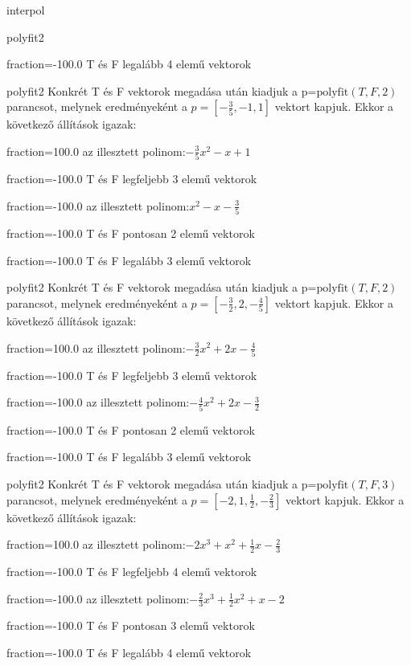 \documentclass[12pt]{article}
\begin{document}
\begin{quiz}{interpol}
\begin{multi}[multiple]{polyfit2}
\item[fraction=-100.0] T és F legalább 4 elemű vektorok
\end{multi}
\begin{multi}[multiple]{polyfit2}
Konkrét T és F vektorok megadása után kiadjuk a p=$\mathrm{polyfit}(T,F,2)$
parancsot, melynek eredményeként a $p=\left[-\frac{3}{5},-1,1\right]$ vektort kapjuk.
Ekkor a következő állítások igazak:
\item[fraction=100.0] az illesztett polinom:$-\frac{3}{5}x^2-x+1$
\item[fraction=-100.0]  T és F legfeljebb 3 elemű vektorok
\item[fraction=-100.0]  az illesztett polinom:$x^2-x-\frac{3}{5}$
\item[fraction=-100.0]  T és F pontosan 2 elemű vektorok
\item[fraction=-100.0] T és F legalább 3 elemű vektorok
\end{multi}
\begin{multi}[multiple]{polyfit2}
Konkrét T és F vektorok megadása után kiadjuk a p=$\mathrm{polyfit}(T,F,2)$
parancsot, melynek eredményeként a $p=\left[-\frac{3}{2},2,-\frac{4}{5}\right]$ vektort kapjuk.
Ekkor a következő állítások igazak:
\item[fraction=100.0] az illesztett polinom:$-\frac{3}{2}x^2+2x-\frac{4}{5}$
\item[fraction=-100.0]  T és F legfeljebb 3 elemű vektorok
\item[fraction=-100.0]  az illesztett polinom:$-\frac{4}{5}x^2+2x-\frac{3}{2}$
\item[fraction=-100.0]  T és F pontosan 2 elemű vektorok
\item[fraction=-100.0] T és F legalább 3 elemű vektorok
\end{multi}
\begin{multi}[multiple]{polyfit2}
Konkrét T és F vektorok megadása után kiadjuk a p=$\mathrm{polyfit}(T,F,3)$
parancsot, melynek eredményeként a $p=\left[-2,1,\frac{1}{2},-\frac{2}{3}\right]$ vektort kapjuk.
Ekkor a következő állítások igazak:
\item[fraction=100.0] az illesztett polinom:$-2x^3+x^2+\frac{1}{2}x-\frac{2}{3}$
\item[fraction=-100.0]  T és F legfeljebb 4 elemű vektorok
\item[fraction=-100.0]  az illesztett polinom:$-\frac{2}{3}x^3+\frac{1}{2}x^2+x-2$
\item[fraction=-100.0]  T és F pontosan 3 elemű vektorok
\item[fraction=-100.0] T és F legalább 4 elemű vektorok

\end{multi}
\end{quiz}
\end{document}
